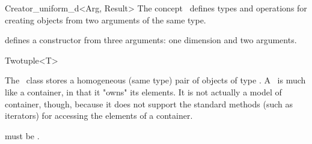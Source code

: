 \begin{ccRefFunctionObjectClass}{Creator_uniform_d<Arg, Result>}
  \ccDefinition The concept \ccRefName\ defines types and operations
  for creating objects from two arguments of the same type.


  \ccRequirements {} defines a constructor from three arguments: 
  one  dimension and two  arguments.

  \def\ccLongParamLayout{\ccTrue}
  \ccTagFullDeclarations{}


  \ccTagDefaults\def\ccLongParamLayout{\ccFalse}
\end{ccRefFunctionObjectClass}



\begin{ccRefClass}{Twotuple<T>}
  
  \ccDefinition The \ccRefName\ class stores a homogeneous (same type) pair
  of objects of type .  A \ccRefName\ is much like a container, in that
  it "owns" its elements. It is not actually a model of container, though,
  because it does not support the standard methods (such as iterators) for
  accessing the elements of a container.

  
  \ccRequirements {} must be .


  \ccTypes

  \ccGlue

  \ccCreation
  
  
  
\end{ccRefClass}

